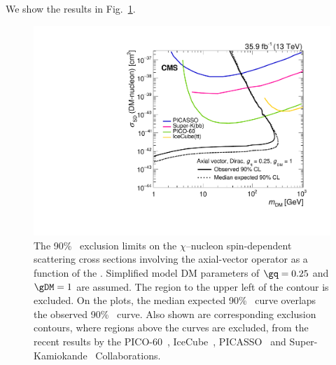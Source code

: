 We show the results in Fig.~\ref{fig:limits_indirect}.

\begin{figure}[htbp]
  \centering
    \includegraphics[width=0.48\linewidth]{Impact/Figures/limits_indirect.pdf}
    \caption{
      The 90\% \CL\ exclusion limits on the $\chi$--nucleon spin-dependent scattering cross sections involving the axial-vector operator as a function of the \mdm.
      Simplified model DM parameters of $\gq=0.25$ and $\gDM=1$ are assumed.
      The region to the upper left of the contour is excluded. 
      On the plots, the median expected 90\% \CL\ curve overlaps the observed 90\% \CL\ curve.
      Also shown are corresponding exclusion contours, where regions above the curves are excluded, from the recent results by the PICO-60~\cite{Amole:2017dex}, IceCube~\cite{Aartsen:2016exj}, PICASSO~\cite{Behnke:2016lsk} and Super-Kamiokande~\cite{Choi:2015ara} Collaborations.
    }
    \label{fig:limits_indirect}
\end{figure}
